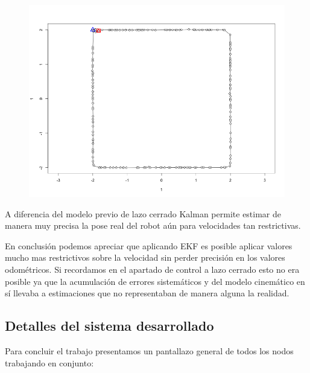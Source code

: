 \begin{figure}[!htb]
\begin{center}
\includegraphics[width=\linewidth/2]{imagenesTrayectorias/ekf/ekf4.png}
\end{center}
\end{figure}
\FloatBarrier




A diferencia del modelo previo de lazo cerrado Kalman permite estimar de manera muy precisa la pose real del robot aún para velocidades tan restrictivas.

En conclusión podemos apreciar que aplicando EKF es posible aplicar valores mucho mas restrictivos sobre la velocidad sin perder precisión en los valores odométricos. Si recordamos en el apartado de control a lazo cerrado esto no era posible ya que la acumulación de errores sistemáticos y del modelo cinemático en sí llevaba a estimaciones que no representaban de manera alguna la realidad.

\subsection{Detalles del sistema desarrollado}

Para concluir el trabajo presentamos un pantallazo general de todos los nodos trabajando en conjunto:

